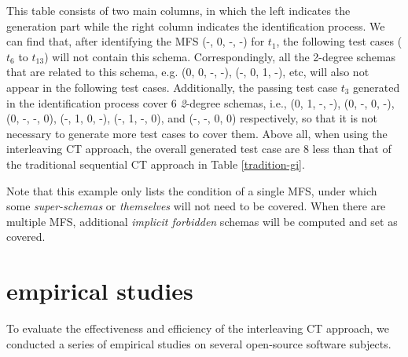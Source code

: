 \documentclass{sig-alternate}
\begin{document}
This table consists of two main columns, in which the left indicates the generation part while the right column indicates the identification process. We can find that, after identifying the MFS (-, 0, -, -) for $t_{1}$, the following test cases ($t_{6}$ to $t_{13}$) will not contain this schema. Correspondingly, all the 2-degree schemas that are related to this schema, e.g. (0, 0, -, -), (-, 0, 1, -), etc, will also not appear in the following test cases. Additionally, the passing test case $t_{3}$ generated in the identification process cover 6 \emph{2}-degree schemas, i.e., (0, 1, -, -), (0, -, 0, -), (0, -, -, 0), (-, 1, 0, -), (-, 1, -, 0), and (-, -, 0, 0) respectively, so that it is not necessary to generate more test cases to cover them.  Above all, when using the interleaving CT approach,  the overall generated test case are 8 less than that of the traditional sequential CT approach in Table \ref{tradition-gi}.

Note that this example only lists the condition of a single MFS, under which some \emph{super-schemas} or \emph{themselves} will not need to be covered.  When there are multiple MFS, additional \emph{implicit forbidden} schemas will be computed and set as covered.



%
%

\section{empirical studies}
To evaluate the effectiveness and efficiency of the interleaving CT approach, we conducted a series of empirical studies on several open-source software subjects.
\end{document}
